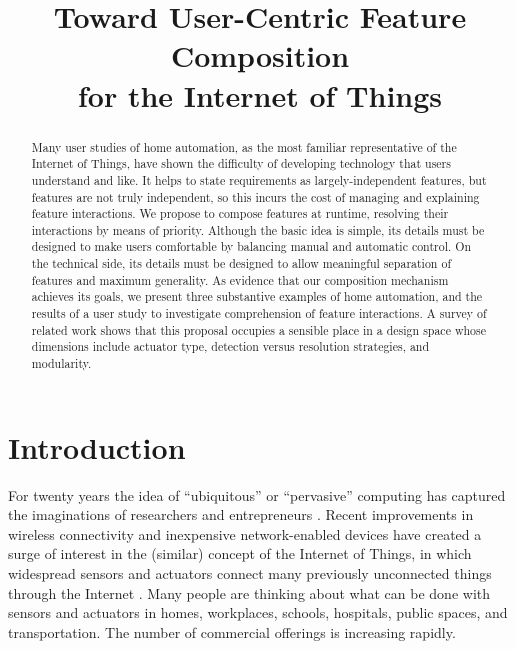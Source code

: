 \documentclass[conference]{IEEEtran}
\begin{document}
\title{Toward User-Centric Feature Composition\\
for the Internet of Things}

\author{
\and
{}
\and
{}
}
\maketitle

\begin{abstract}
Many user studies of home automation, as the most familiar representative
of the Internet of Things, have shown the difficulty of developing
technology that users understand and like.
It helps to state requirements as largely-independent features,
but features are not truly independent, so this incurs the cost of
managing and explaining feature interactions.
We propose to compose features at runtime, resolving their interactions
by means of priority.
Although the basic idea is simple, its details must be designed
to make users comfortable by balancing manual and automatic control.
On the technical side, its details must be designed to allow meaningful
separation of features and maximum generality.
As evidence that our composition mechanism achieves its goals, 
we present three substantive examples of home automation,
and the results of a user study to investigate comprehension of 
feature interactions.
A survey of related work shows that this proposal occupies a sensible
place in a design space whose dimensions include actuator type,
detection versus resolution strategies, and modularity.
\end{abstract}

\section{Introduction}
\label{sec:intro}

For twenty years the idea of
``ubiquitous'' or ``pervasive'' computing has captured the imaginations
of researchers and entrepreneurs
\cite{caceres}.
Recent improvements in wireless connectivity and inexpensive
network-enabled devices have created a surge of
interest in the (similar) concept of the
Internet of Things, in which widespread sensors and actuators connect
many previously unconnected things through the Internet 
\cite{iotcomix,atzori,iot}.
Many people
are thinking about what can be done with sensors and actuators in homes,
workplaces, schools, hospitals, public spaces, and transportation.
The number of commercial offerings is increasing rapidly.
\end{document}
